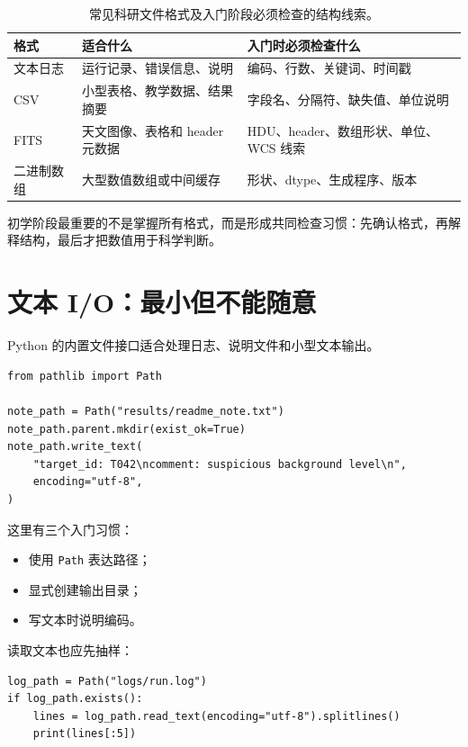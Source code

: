 \begin{table}[htbp]
\centering
\begin{tabular}{p{}p{}p{}}
\toprule
格式 & 适合什么 & 入门时必须检查什么 \\
\midrule
文本日志 & 运行记录、错误信息、说明 & 编码、行数、关键词、时间戳 \\
CSV & 小型表格、教学数据、结果摘要 & 字段名、分隔符、缺失值、单位说明 \\
FITS & 天文图像、表格和 header 元数据 & HDU、header、数组形状、单位、WCS 线索 \\
二进制数组 & 大型数值数组或中间缓存 & 形状、dtype、生成程序、版本 \\
\bottomrule
\end{tabular}
\caption{常见科研文件格式及入门阶段必须检查的结构线索。}
\label{tab:ch06_file_formats}
\end{table}

初学阶段最重要的不是掌握所有格式，而是形成共同检查习惯：先确认格式，再解释结构，最后才把数值用于科学判断。

\section{文本 I/O：最小但不能随意}

Python 的内置文件接口适合处理日志、说明文件和小型文本输出。

\begin{examplebox}[写入一个说明文件]
\begin{lstlisting}[style=pythonstyle]
from pathlib import Path

note_path = Path("results/readme_note.txt")
note_path.parent.mkdir(exist_ok=True)
note_path.write_text(
    "target_id: T042\ncomment: suspicious background level\n",
    encoding="utf-8",
)
\end{lstlisting}
\end{examplebox}

这里有三个入门习惯：

\begin{itemize}
    \item 使用 \texttt{Path} 表达路径；
    \item 显式创建输出目录；
    \item 写文本时说明编码。
\end{itemize}

读取文本也应先抽样：

\begin{examplebox}[读取文本前几行]
\begin{lstlisting}[style=pythonstyle]
log_path = Path("logs/run.log")
if log_path.exists():
    lines = log_path.read_text(encoding="utf-8").splitlines()
    print(lines[:5])
\end{lstlisting}
\end{examplebox}

